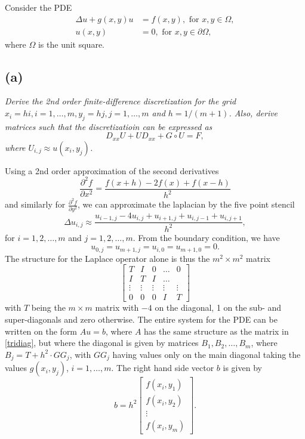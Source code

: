 Consider the PDE
\begin{equation}
\begin{aligned}
\Delta u+g(x,y)u &= f(x,y),\text{ for }x,y\in\Omega,\\
u(x,y) & = 0,\text{ for }x,y\in\partial\Omega,
\end{aligned}
\end{equation}
where $\Omega$ is the unit square.
\subsection*{(a)}
\emph{Derive the 2nd order finite-difference discretization for the grid $x_i = hi, i = 1,\dots,m,y_j = hj,j = 1,\dots,m$ and $h = 1/(m+1)$. Also, derive matrices such that the discretizatioin can be expressed as
\begin{equation}\label{lyapPDE}
D_{xx}U+UD_{xx}+G\circ U = F,
\end{equation}
where $U_{i,j} \approx u(x_i,y_j)$. }

Using a 2nd order approximation of the second derivatives
\begin{equation}
\frac{\partial^2 f}{\partial x^2} = \frac{f(x+h)-2f(x)+f(x-h)}{h^2}
\end{equation}
and similarly for $\frac{\partial^2 f}{\partial y^2}$, we can approximate the laplacian by the five point stencil
\begin{equation}
\Delta u_{i,j} \approx \frac{u_{i-1,j}-4u_{i,j}+u_{i+1,j}+u_{i,j-1}+u_{i,j+1}}{h^2},
\end{equation}
for $i = 1,2,\dots,m$ and $j = 1,2,\dots,m$.
From the boundary condition, we have
\begin{equation}
u_{0,j} = u_{m+1,j}=u_{i,0} = u_{m+1,0} = 0.
\end{equation}
The structure for the Laplace operator alone is thus the $m^2\times m^2$ matrix
\begin{equation}\label{tridiag}
\begin{bmatrix}
T &I &0 &\dots& 0\\
I & T& I & \dots \\
\vdots &\vdots& \vdots &\vdots& \vdots\\
0 & 0 & 0 &I& T
\end{bmatrix}
\end{equation}
with $T$ being the $m\times m$ matrix with $-4$ on the diagonal, 1 on the sub- and super-diagonals and zero otherwise.
The entire system for the PDE can be written on the form $Au = b$, where $A$ has the same structure as the matrix in \eqref{tridiag}, but where the diagonal is given by matrices $B_1,B_2,\dots, B_m$, where $B_j = T+h^2\cdot GG_j$, with $GG_j$ having values only on the main diagonal taking the values $g(x_i,y_j)$, $i=1,\dots,m$. The right hand side vector $b$ is given by
\begin{equation}
b = h^2
\begin{bmatrix}
f(x_i,y_1)\\
f(x_i,y_2)\\
\vdots\\
f(x_i,y_m)
\end{bmatrix}.
\end{equation}


